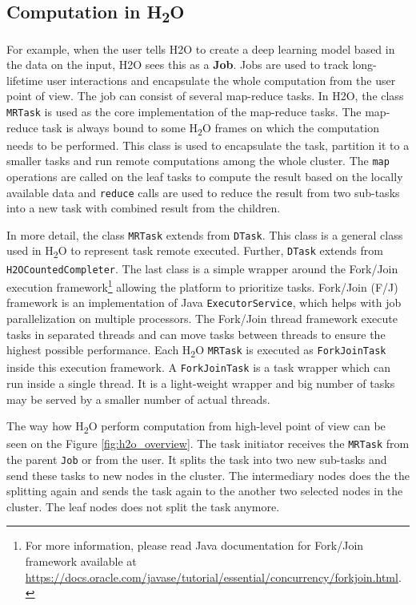\subsection{Computation in H\textsubscript{2}O}
For example, when the user tells H2O to create a deep learning model based in the data on the input, H2O sees this as a \textbf{Job}. Jobs are used to track long-lifetime user interactions and encapsulate the whole computation from the user point of view. The job can consist of several map-reduce tasks. In H2O, the class \texttt{MRTask} is used as the core implementation of the map-reduce tasks. The map-reduce task is always bound to some  H\textsubscript{2}O frames on which the computation needs to be performed. This class is used to encapsulate the task, partition it to a smaller tasks and run remote computations among the whole cluster. The \texttt{map} operations are called on the leaf tasks to compute the result based on the locally available data and \texttt{reduce} calls are used to reduce the result from two sub-tasks into a new task with combined result from the children.

In more detail, the class \texttt{MRTask} extends from \texttt{DTask}. This class is a general class used in H\textsubscript{2}O to represent task remote executed. Further, \texttt{DTask} extends from \texttt{H2OCountedCompleter}. The last class is a simple wrapper around the Fork/Join execution framework\footnote{For more information, please read Java documentation for Fork/Join framework available at \url{https://docs.oracle.com/javase/tutorial/essential/concurrency/forkjoin.html}.} allowing the platform to prioritize tasks. Fork/Join (F/J) framework is an implementation of Java \texttt{ExecutorService}, which helps with job parallelization on multiple processors. The Fork/Join thread framework execute tasks in separated threads and can move tasks between threads to ensure the highest possible performance. Each H\textsubscript{2}O \texttt{MRTask} is executed as \texttt{ForkJoinTask} inside this execution framework. A \texttt{ForkJoinTask} is a task wrapper which can run inside a single thread. It is a light-weight wrapper and big number of tasks may be served by a smaller number of actual threads.

The way how H\textsubscript{2}O perform computation from high-level point of view can be seen on the Figure \ref{fig:h2o_overview}. The task initiator receives the \texttt{MRTask} from the parent \texttt{Job} or from the user. It splits the task into two new sub-tasks and send these tasks to new nodes in the cluster. The intermediary nodes does the the splitting again and sends the task again to the another two selected nodes in the cluster. The leaf nodes does not split the task anymore.

